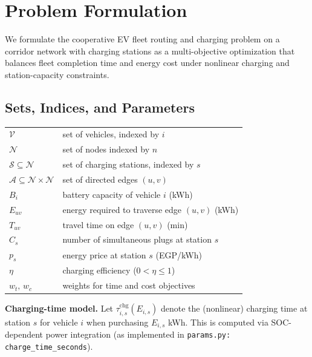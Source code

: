 \section{Problem Formulation}
\label{sec:formulation}

We formulate the cooperative EV fleet routing and charging problem on a corridor network with charging stations as a multi-objective optimization that balances fleet completion time and energy cost under nonlinear charging and station-capacity constraints.

\subsection{Sets, Indices, and Parameters}
\begin{tabular}{@{}ll@{}}
$\mathcal{V}$ & set of vehicles, indexed by $i$ \\
$\mathcal{N}$ & set of nodes indexed by $n$ \\
$\mathcal{S}\subseteq\mathcal{N}$ & set of charging stations, indexed by $s$ \\
$\mathcal{A}\subseteq\mathcal{N}\times\mathcal{N}$ & set of directed edges $(u,v)$ \\
\midrule
$B_i$ & battery capacity of vehicle $i$ (kWh) \\
$E_{uv}$ & energy required to traverse edge $(u,v)$ (kWh) \\
$T_{uv}$ & travel time on edge $(u,v)$ (min) \\
$C_s$ & number of simultaneous plugs at station $s$ \\
$p_s$ & energy price at station $s$ (EGP/kWh) \\
$\eta$ & charging efficiency ($0<\eta\le 1$) \\
$w_t,\,w_c$ & weights for time and cost objectives \\
\end{tabular}

\vspace{0.5em}
\noindent \textbf{Charging-time model.}
Let $\tau^{\text{chg}}_{i,s}(E_{i,s})$ denote the (nonlinear) charging time at station $s$ for vehicle $i$ when purchasing $E_{i,s}$ kWh. This is computed via SOC-dependent power integration (as implemented in \texttt{params.py: \texttt{charge\_time\_seconds}}).

